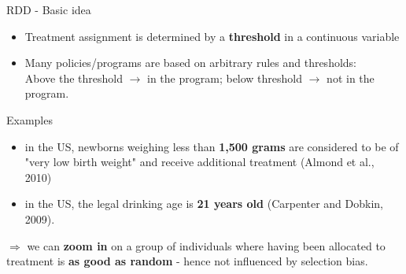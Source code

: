 \documentclass[11pt, aspectratio = 169]{beamer}
\begin{document}
	\begin{frame}{RDD - Basic idea}
		\begin{itemize}
			\item  Treatment assignment is determined by a \textbf{threshold} in a continuous variable 
			
			\item Many policies/programs are based on arbitrary rules and thresholds: \\ Above the threshold $\rightarrow$ in the program; below threshold $\rightarrow$ not in the program.
		\end{itemize}		
		\pause 

		\begin{block}{Examples}
			\begin{itemize}
				\item in the US, newborns weighing less than \textbf{1,500 grams} are considered to be of "very low birth weight" and receive additional treatment \footnotesize{(Almond et al., 2010)}
				\item \normalsize	in the US, the legal drinking age is \textbf{21 years old} \footnotesize{(Carpenter and Dobkin, 2009).}
			\end{itemize}
		\end{block}
		\pause 
		
		$\Rightarrow$	we can \textbf{zoom in} on a group of individuals where having been allocated to \hspace*{+0.5cm}treatment is \textbf{as good as random} - hence not influenced by selection bias.
\end{frame}
\end{document}

